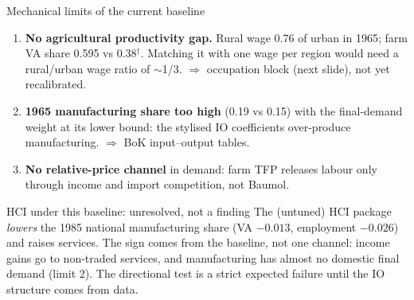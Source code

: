 \documentclass[10pt,aspectratio=169]{beamer}
\newcommand{\unv}{$^{\dagger}$}
\begin{document}
\begin{frame}{Mechanical limits of the current baseline}
  \small
  \begin{enumerate}
    \item \textbf{No agricultural productivity gap.} Rural wage 0.76 of urban in 1965;
          farm VA share 0.595 vs 0.38\unv. Matching it with one wage per region would need
          a rural/urban wage ratio of $\sim$1/3. $\Rightarrow$ occupation block (next
          slide), not yet recalibrated.
    \item \textbf{1965 manufacturing share too high} (0.19 vs 0.15) with the final-demand
          weight at its lower bound: the stylised IO coefficients over-produce
          manufacturing. $\Rightarrow$ BoK input--output tables.
    \item \textbf{No relative-price channel} in demand: farm TFP releases labour only
          through income and import competition, not Baumol.
  \end{enumerate}
  \begin{alertblock}{HCI under this baseline: unresolved, not a finding}
    The (untuned) HCI package \emph{lowers} the 1985 national manufacturing share (VA
    $-0.013$, employment $-0.026$) and raises services. The sign comes from the baseline,
    not one channel: income gains go to non-traded services, and manufacturing has almost
    no domestic final demand (limit 2). The directional test is a strict expected failure
    until the IO structure comes from data.
  \end{alertblock}
\end{frame}
\end{document}
